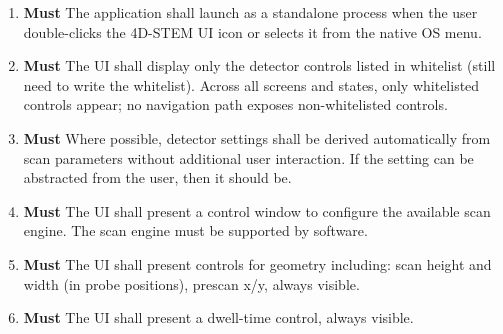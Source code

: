 \documentclass[10pt]{article}
\newcommand{\PriorityTag}[2]{%
    \colorbox{#2!25}{\footnotesize\textsf{\textbf{#1}}}\hspace{0.6em}}
\newcommand{\must}{\leavevmode\PriorityTag{Must}{green}}
\newcounter{reqgrp}[section] %
\newcounter{reqno}
\newcommand{\reqprefix}{GEN}
\newenvironment{requirements}[1]{%
    \renewcommand{\reqprefix}{#1}%
    \refstepcounter{reqgrp}%
    \setcounter{reqno}{0}%
    \begin{enumerate}[leftmargin=*]
    }{\end{enumerate}}
\begin{document}
    \begin{requirements}{UI}

        \item \must {}
        {The application shall launch as a standalone process when the user double-clicks the 4D-STEM UI icon or selects it from the native OS menu.}

        \item \must {}
        {The UI shall display only the detector controls listed in whitelist (still need to write the whitelist).}
        {Across all screens and states, only whitelisted controls appear; no navigation path exposes non-whitelisted controls.}

        \item \must {}
        { Where possible, detector settings shall be derived automatically from scan parameters without additional user interaction. If the setting can be abstracted from the user, then it should be.}

        \item \must {}
        {The UI shall present a control window to configure the available scan engine. The scan engine must be supported by software.}

        \item \must {}
        {The UI shall present controls for geometry including: scan height and width (in probe positions), prescan x/y, always visible.}

        \item \must {}
        {The UI shall present a dwell-time control, always visible.}


\end{requirements}
\end{document}
